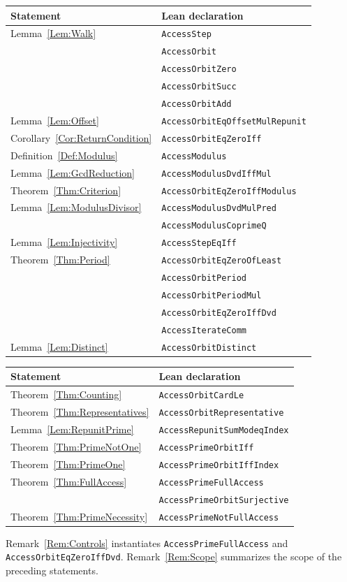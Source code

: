 \documentclass[11pt,letterpaper]{article}
\begin{document}
\begin{center}
\begin{tabular}{ll}
\toprule
Statement & Lean declaration \\
\midrule
Lemma~\ref{Lem:Walk} & \texttt{AccessStep} \\
 & \texttt{AccessOrbit} \\
 & \texttt{AccessOrbitZero} \\
 & \texttt{AccessOrbitSucc} \\
 & \texttt{AccessOrbitAdd} \\
Lemma~\ref{Lem:Offset} & \texttt{AccessOrbitEqOffsetMulRepunit} \\
Corollary~\ref{Cor:ReturnCondition} & \texttt{AccessOrbitEqZeroIff} \\
Definition~\ref{Def:Modulus} & \texttt{AccessModulus} \\
Lemma~\ref{Lem:GcdReduction} & \texttt{AccessModulusDvdIffMul} \\
Theorem~\ref{Thm:Criterion} & \texttt{AccessOrbitEqZeroIffModulus} \\
Lemma~\ref{Lem:ModulusDivisor} & \texttt{AccessModulusDvdMulPred} \\
 & \texttt{AccessModulusCoprimeQ} \\
Lemma~\ref{Lem:Injectivity} & \texttt{AccessStepEqIff} \\
Theorem~\ref{Thm:Period} & \texttt{AccessOrbitEqZeroOfLeast} \\
 & \texttt{AccessOrbitPeriod} \\
 & \texttt{AccessOrbitPeriodMul} \\
 & \texttt{AccessOrbitEqZeroIffDvd} \\
 & \texttt{AccessIterateComm} \\
Lemma~\ref{Lem:Distinct} & \texttt{AccessOrbitDistinct} \\
\bottomrule
\end{tabular}
\end{center}

\begin{center}
\begin{tabular}{ll}
\toprule
Statement & Lean declaration \\
\midrule
Theorem~\ref{Thm:Counting} & \texttt{AccessOrbitCardLe} \\
Theorem~\ref{Thm:Representatives} & \texttt{AccessOrbitRepresentative} \\
Lemma~\ref{Lem:RepunitPrime} & \texttt{AccessRepunitSumModeqIndex} \\
Theorem~\ref{Thm:PrimeNotOne} & \texttt{AccessPrimeOrbitIff} \\
Theorem~\ref{Thm:PrimeOne} & \texttt{AccessPrimeOrbitIffIndex} \\
Theorem~\ref{Thm:FullAccess} & \texttt{AccessPrimeFullAccess} \\
 & \texttt{AccessPrimeOrbitSurjective} \\
Theorem~\ref{Thm:PrimeNecessity} & \texttt{AccessPrimeNotFullAccess} \\
\bottomrule
\end{tabular}
\end{center}

Remark~\ref{Rem:Controls} instantiates \texttt{AccessPrimeFullAccess}
and \texttt{AccessOrbitEqZeroIffDvd}.
Remark~\ref{Rem:Scope} summarizes the scope of the preceding statements.
\end{document}
